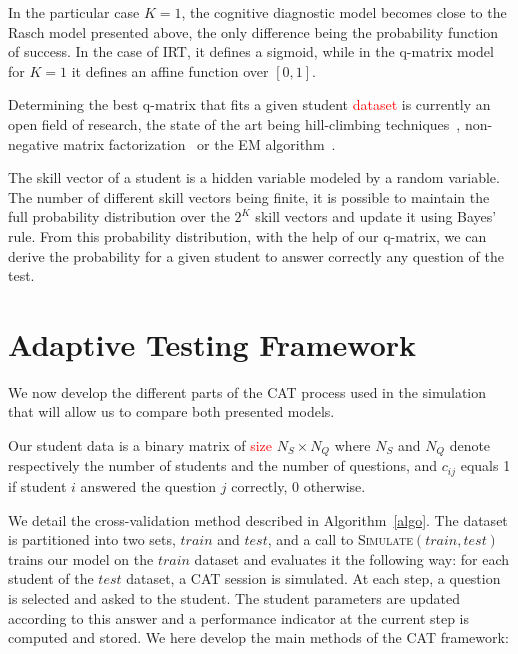 \documentclass{sig-alternate}
\newcommand\alert[1]{\textcolor{red}{#1}}
\begin{document}
In the particular case $K=1$, the cognitive diagnostic model becomes close to the Rasch model presented above, the only difference being the probability function of success. In the case of IRT, it defines a sigmoid, while in the q-matrix model for $K = 1$ it defines an affine function over $[0,1]$.

Determining the best q-matrix that fits a given student \alert{dataset} is currently an open field of research, the state of the art being hill-climbing techniques~\cite{Barnes2005}, non-negative matrix factorization~\cite{Desmarais2011} or the EM algorithm~\cite{Huebner2010}. 

The skill vector of a student is a hidden variable modeled by a random variable. The number of different skill vectors being finite, it is possible to maintain the full probability distribution over the $2^K$ skill vectors and update it using Bayes' rule. From this probability distribution, with the help of our q-matrix, we can derive the probability for a given student to answer correctly any question of the test.



\section{Adaptive Testing Framework}

We now develop the different parts of the CAT process used in the simulation that will allow us to compare both presented models.

Our student data is a binary matrix of \alert{size} $N_S \times N_Q$ where $N_S$ and $N_Q$ denote respectively the number of students and the number of questions, and $c_{ij}$ equals 1 if student $i$ answered the question $j$ correctly, 0 otherwise. 

We detail the cross-validation method described in Algorithm~\ref{algo}. The dataset is partitioned into two sets, $train$ and $test$, and a call to \textsc{Simulate}$(train, test)$ trains our model on the $train$ dataset and evaluates it the following way: for each student of the $test$ dataset, a CAT session is simulated. At each step, a question is selected and asked to the student. The student parameters are updated according to this answer and a performance indicator at the current step is computed and stored. We here develop the main methods of the CAT framework:
\end{document}
